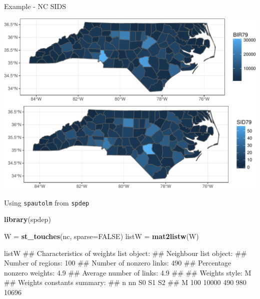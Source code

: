 \documentclass[11pt,ignorenonframetext,]{beamer}
\newenvironment{Shaded}{}{}
\newcommand{\KeywordTok}[1]{\textcolor[rgb]{0.00,0.44,0.13}{\textbf{#1}}}
\newcommand{\DataTypeTok}[1]{\textcolor[rgb]{0.56,0.13,0.00}{#1}}
\newcommand{\StringTok}[1]{\textcolor[rgb]{0.25,0.44,0.63}{#1}}
\newcommand{\OtherTok}[1]{\textcolor[rgb]{0.00,0.44,0.13}{#1}}
\newcommand{\NormalTok}[1]{#1}
\let\oldShaded\Shaded
\let\endoldShaded\endShaded
\renewenvironment{Shaded}{\footnotesize\begin{spacing}{0.9}\oldShaded}{\endoldShaded\end{spacing}}
\begin{document}
\begin{frame}{Example - NC SIDS}

\includegraphics{Lec19_files/figure-beamer/unnamed-chunk-4-1.pdf}

\end{frame}

\begin{frame}[fragile,t]{Using \texttt{spautolm} from \texttt{spdep}}

\begin{Shaded}
\begin{Highlighting}[]
\KeywordTok{library}\NormalTok{(spdep)}

\NormalTok{W =}\StringTok{ }\KeywordTok{st_touches}\NormalTok{(nc, }\DataTypeTok{sparse=}\OtherTok{FALSE}\NormalTok{)}
\NormalTok{listW =}\StringTok{ }\KeywordTok{mat2listw}\NormalTok{(W)}

\NormalTok{listW}
\NormalTok{## Characteristics of weights list object:}
\NormalTok{## Neighbour list object:}
\NormalTok{## Number of regions: 100 }
\NormalTok{## Number of nonzero links: 490 }
\NormalTok{## Percentage nonzero weights: 4.9 }
\NormalTok{## Average number of links: 4.9 }
\NormalTok{## }
\NormalTok{## Weights style: M }
\NormalTok{## Weights constants summary:}
\NormalTok{##     n    nn  S0  S1    S2}
\NormalTok{## M 100 10000 490 980 10696}
\end{Highlighting}
\end{Shaded}

\end{frame}
\end{document}
